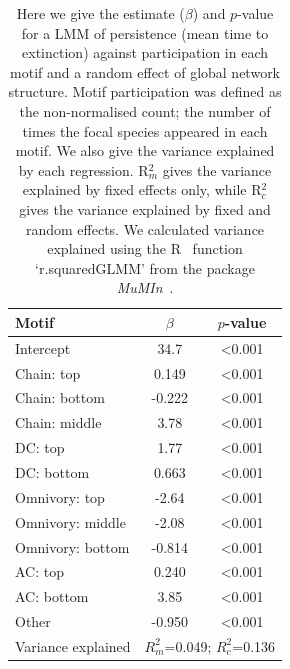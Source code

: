 \documentclass[12pt]{article}
\begin{document}
\begin{spacing}{2.0}
		\begin{table}[hb!]
    		\caption{Here we give the estimate ($\beta$) and $p$-value for a LMM of persistence (mean time to extinction) against participation in each motif and a random effect of global network structure. Motif participation was defined as the non-normalised count; the number of times the focal species appeared in each motif. We also give the variance explained by each regression. R$^{2}_{m}$ gives the variance explained by fixed effects only, while R$^{2}_{c}$ gives the variance explained by fixed and random effects. We calculated variance explained using the R~\citep{R} function `r.squaredGLMM' from the package \emph{MuMIn}~\citep{MuMIn}.}
    		\label{tab:Z_positions}
    		\begin{tabular}{l | c c}
    		Motif & $\beta$ & $p$-value \\  
    		\hline
            Intercept	&	34.7	&	\textless0.001	\\
            Chain: top	&	0.149	&	\textless0.001	\\
            Chain: bottom	&	-0.222	&	\textless0.001	\\
            Chain: middle	&	3.78	&	\textless0.001	\\
            DC: top	&	1.77	&	\textless0.001	\\
            DC: bottom	&	0.663	&	\textless0.001	\\
            Omnivory: top	&	-2.64	&	\textless0.001	\\
            Omnivory: middle	&	-2.08	&	\textless0.001	\\
            Omnivory: bottom	&	-0.814	&	\textless0.001	\\
            AC: top	&	0.240	&	\textless0.001	\\
            AC: bottom	&	3.85	&	\textless0.001	\\
            Other	&	-0.950	&	\textless0.001	\\
            \hline
    		Variance explained & \multicolumn{2}{c}{$R^{2}_m$=0.049; $R^2_c$=0.136} \\
    		\hline
    		\end{tabular}
    		\end{table}


\end{spacing}
\end{document}
